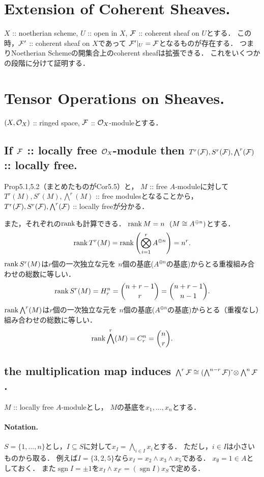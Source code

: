 \documentclass[a4paper]{jsarticle}
\DeclareMathOperator{\sgn}{sgn}
\begin{document}
\section{Extension of Coherent Sheaves.} %
    $X$ :: noetherian scheme, $U$ :: open in $X$, 
    $\mathcal{F}$ :: coherent sheaf on $U$とする．
    この時，$\mathcal{F}'$ :: coherent sheaf on $X$であって
    $\mathcal{F}'|_U=\mathcal{F}$となるものが存在する．
    つまりNoetherian Schemeの開集合上のcoherent sheafは拡張できる．
    これをいくつかの段階に分けて証明する．

\section{Tensor Operations on Sheaves.} %
    $(X, \mathcal{O}_X)$ :: ringed space, $\mathcal{F}$ :: $\mathcal{O}_X$-moduleとする．

    \subsection{If $\mathcal{F}$ :: locally free $\mathcal{O}_X$-module then 
        $T^r(\mathcal{F}), S^r(\mathcal{F}), \bigwedge^r(\mathcal{F})$ :: locally free.}
    Prop5.1,5.2（まとめたものがCor5.5）と，
    $M$ :: free $A$-moduleに対して
    $T^r(M), S^r(M), \bigwedge^r(M)$ :: free modulesとなることから，
    $T^r(\mathcal{F}), S^r(\mathcal{F}), \bigwedge^r(\mathcal{F})$ :: locally freeが分かる．

    また，それぞれの$\operatorname{rank}$も計算できる．
    $\operatorname{rank} M=n ~~(M \cong A^{\oplus n})$とする．
    \[ \operatorname{rank} T^r(M)=\operatorname{rank} \left(\bigotimes_{i=1}^r A^{\oplus n} \right)=n^r. \]
    $\operatorname{rank} S^r(M)$は$r$個の一次独立な元を
    $n$個の基底($A^{\oplus n}$の基底)からとる重複組み合わせの総数に等しい．
    \[ \operatorname{rank} S^r(M)=H_r^n=\binom{n+r-1}{r}=\binom{n+r-1}{n-1}. \]
    $\operatorname{rank} \bigwedge^r(M)$は$r$個の一次独立な元を
    $n$個の基底($A^{\oplus n}$の基底)からとる（重複なし）組み合わせの総数に等しい．
    \[ \operatorname{rank} \bigwedge^r(M)=C_r^n=\binom{n}{r}. \]

    \subsection{the multiplication map induces
        $\bigwedge^r \mathcal{F} \cong (\bigwedge^{n-r} \mathcal{F})\,\check{} \otimes \bigwedge^n \mathcal{F}$.}
    $M$ :: locally free $A$-moduleとし，
    $M$の基底を$x_1,\dots,x_n$とする．
    
    \paragraph{Notation.}
    $S=\{1,\dots,n\}$とし，$I \subseteq S$に対して$x_I=\bigwedge_{i \in I} x_i$とする．
    ただし，$i \in I$は小さいものから取る．
    例えば$I=\{3,2,5\}$なら$x_I=x_2 \wedge x_3 \wedge x_5$である．
    $x_{\emptyset}=1 \in A$としておく．
    また$\sgn I=\pm 1$を$x_I \wedge x_{I^c}=(\sgn I) x_S$で定める．
\end{document}
